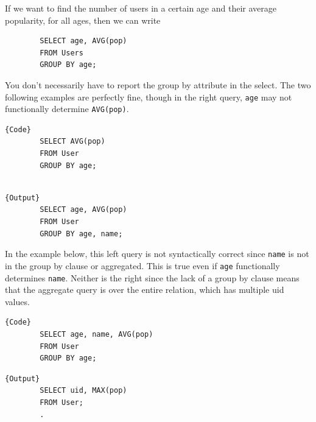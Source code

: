     \begin{example}
      \label{ex:grouping-by-age-with-aggregates}
      If we want to find the number of users in a certain age and their average popularity, for all ages, then we can write 
      \begin{lstlisting}
        SELECT age, AVG(pop) 
        FROM Users
        GROUP BY age; 
      \end{lstlisting}
      You don't necessarily have to report the group by attribute in the select. The two following examples are perfectly fine, though in the right query, \texttt{age} may not functionally determine \texttt{AVG(pop)}. 

      \noindent\begin{minipage}{.5\textwidth}
      \begin{lstlisting}[]{Code}
        SELECT AVG(pop) 
        FROM User
        GROUP BY age; 
        
      \end{lstlisting}
      \end{minipage}
      \hfill
      \begin{minipage}{.49\textwidth}
      \begin{lstlisting}[]{Output}
        SELECT age, AVG(pop)  
        FROM User 
        GROUP BY age, name; 
      \end{lstlisting}
      \end{minipage}

      In the example below, this left query is not syntactically correct since \texttt{name} is not in the group by clause or aggregated. This is true even if \texttt{age} functionally determines \texttt{name}. Neither is the right since the lack of a group by clause means that the aggregate query is over the entire relation, which has multiple uid values. 

      \noindent\begin{minipage}{.5\textwidth}
      \begin{lstlisting}[]{Code}
        SELECT age, name, AVG(pop) 
        FROM User
        GROUP BY age; 
      \end{lstlisting}
      \end{minipage}
      \hfill
      \begin{minipage}{.49\textwidth}
      \begin{lstlisting}[]{Output}
        SELECT uid, MAX(pop) 
        FROM User; 
        .
      \end{lstlisting}
      \end{minipage}
    \end{example}

